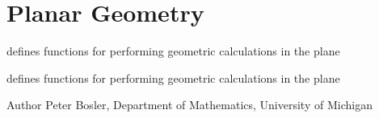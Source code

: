\hypertarget{group__PlaneGeom}{\section{Planar Geometry}
\label{group__PlaneGeom}
}


defines functions for performing geometric calculations in the plane  


defines functions for performing geometric calculations in the plane 

\begin{DoxyAuthor}{Author}
Peter Bosler, Department of Mathematics, University of Michigan 
\end{DoxyAuthor}
